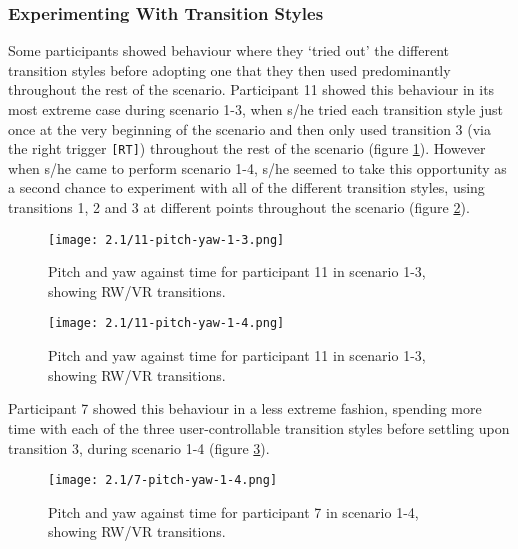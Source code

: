 
\subsubsection{Experimenting With Transition Styles}

Some participants showed behaviour where they `tried out' the different transition styles before adopting one that they then used predominantly throughout the rest of the scenario. Participant 11 showed this behaviour in its most extreme case during scenario 1-3, when s/he tried each transition style just once at the very beginning of the scenario and then only used transition 3 (via the right trigger \texttt{[RT]}) throughout the rest of the scenario (figure \ref{11-pitch-yaw-1-3.png}). However when s/he came to perform scenario 1-4, s/he seemed to take this opportunity as a second chance to experiment with all of the different transition styles, using transitions 1, 2 and 3 at different points throughout the scenario (figure \ref{11-pitch-yaw-1-4.png}).

\begin{figure}[h]
	\begin{center}
	\texttt{[image: 2.1/11-pitch-yaw-1-3.png]}
	\caption{Pitch and yaw against time for participant 11 in scenario 1-3, showing RW/VR transitions.}
	\label{11-pitch-yaw-1-3.png}
	\end{center}
\end{figure}

\begin{figure}[h]
	\begin{center}
	\texttt{[image: 2.1/11-pitch-yaw-1-4.png]}
	\caption{Pitch and yaw against time for participant 11 in scenario 1-3, showing RW/VR transitions.}
	\label{11-pitch-yaw-1-4.png}
	\end{center}
\end{figure}

Participant 7 showed this behaviour in a less extreme fashion, spending more time with each of the three user-controllable transition styles before settling upon transition 3, during scenario 1-4 (figure \ref{7-pitch-yaw-1-4.png}).

\begin{figure}[h]
	\begin{center}
	\texttt{[image: 2.1/7-pitch-yaw-1-4.png]}
	\caption{Pitch and yaw against time for participant 7 in scenario 1-4, showing RW/VR transitions.}
	\label{7-pitch-yaw-1-4.png}
	\end{center}
\end{figure}

